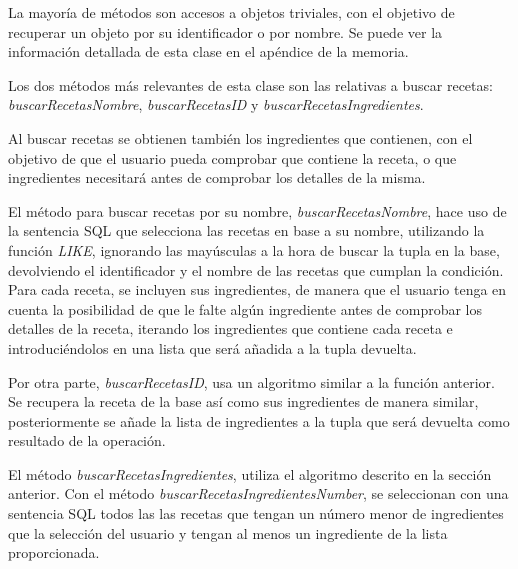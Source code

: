 La mayoría de métodos son accesos a objetos triviales, con el objetivo de recuperar un objeto por su identificador o por nombre. Se puede ver la información detallada de esta clase en el apéndice de la memoria.

Los dos métodos más relevantes de esta clase son las relativas a buscar recetas: \textit{buscarRecetasNombre}, \textit{buscarRecetasID} y \textit{buscarRecetasIngredientes}.

Al buscar recetas se obtienen también los ingredientes que contienen, con el objetivo de que el usuario pueda comprobar que contiene la receta, o que ingredientes necesitará antes de comprobar los detalles de la misma.

El método para buscar recetas por su nombre, \textit{buscarRecetasNombre}, hace uso de la sentencia \gls{SQL} que selecciona las recetas en base a su nombre, utilizando la función \textit{LIKE},  ignorando las mayúsculas a la hora de buscar la \gls{tupla} en la \gls{base}, devolviendo el identificador y el nombre de las recetas que cumplan la condición.
Para cada receta, se incluyen sus ingredientes, de manera que el usuario tenga en cuenta la posibilidad de que le falte algún ingrediente antes de comprobar los detalles de la receta, iterando los ingredientes que contiene cada receta e introduciéndolos en una lista que será añadida a la \gls{tupla} devuelta.

Por otra parte, \textit{buscarRecetasID}, usa un algoritmo similar a la función anterior. Se recupera la receta de la \gls{base} así como sus ingredientes de manera similar, posteriormente se añade la lista de ingredientes a la \gls{tupla} que será devuelta como resultado de la operación. 

El método \textit{buscarRecetasIngredientes}, utiliza el algoritmo descrito en la sección anterior. Con el método \emph{buscarRecetasIngredientesNumber}, se seleccionan con una sentencia \gls{SQL} todos las las recetas que tengan un número menor de ingredientes que la selección del usuario y tengan al menos un ingrediente de la lista proporcionada. 

